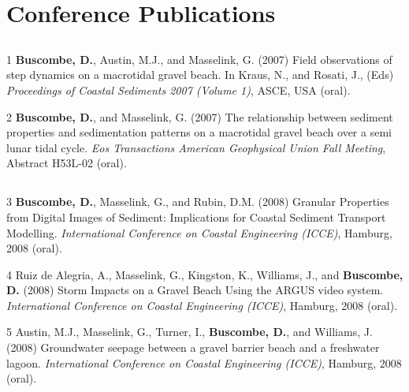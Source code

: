 \documentclass[margin,line]{resume}
\begin{document}
\begin{resume}
\begin{footnotesize}
\begin{list1}
	\end{list1}
        
        \end{footnotesize}

    \section{\mysidestyle Conference Publications}

	\subsection{}
        \begin{footnotesize}
	\begin{list1}
	\item[1] {\bf Buscombe, D.}, Austin, M.J., and Masselink, G. (2007) Field observations of step dynamics on a macrotidal gravel beach. In Kraus, N., and Rosati, J., (Eds) {\sl Proceedings of Coastal Sediments 2007 (Volume 1)}, ASCE, USA (oral).\\
	
	\item[2] {\bf Buscombe, D.}, and Masselink, G. (2007) The relationship between sediment properties and sedimentation patterns on a macrotidal gravel beach over a semi lunar tidal cycle. {\sl Eos Transactions American Geophysical Union Fall Meeting}, Abstract H53L-02 (oral).
	\end{list1}

	\subsection{}
	\begin{list1}
	\item[3] {\bf Buscombe, D.}, Masselink, G., and Rubin, D.M. (2008) Granular Properties from Digital Images of Sediment: Implications for Coastal Sediment Transport Modelling. {\sl International Conference on Coastal Engineering (ICCE)}, Hamburg, 2008 (oral).\\
	
	\item[4] Ruiz de Alegria, A., Masselink, G., Kingston, K., Williams, J., and {\bf Buscombe, D.} (2008) Storm Impacts on a Gravel Beach Using the ARGUS video system. {\sl International Conference on Coastal Engineering (ICCE)}, Hamburg, 2008 (oral).\\
	
	\item[5] Austin, M.J., Masselink, G., Turner, I., {\bf Buscombe, D.}, and Williams, J. (2008) Groundwater seepage between a gravel barrier beach and a freshwater lagoon. {\sl International Conference on Coastal Engineering (ICCE)}, Hamburg, 2008 (oral).\\
	

\end{list1}
\end{footnotesize}
\end{resume}
\end{document}
